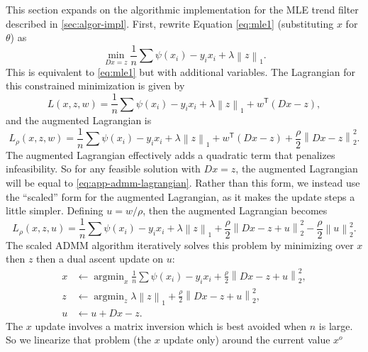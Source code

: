 \documentclass[ejs,noshowframe]{imsart}
\theoremstyle{plain}
\theoremstyle{definition}
\DeclareMathOperator*{\argmin}{argmin}
\renewcommand{\top}{\mathsf{T}}
\begin{document}
\begin{appendix}
This section expands on the algorithmic implementation for the MLE trend filter
described in \autoref{sec:algor-impl}. First, rewrite Equation \eqref{eq:mle1} 
(substituting $x$ for $\theta$) as
\begin{equation}
	\min_{Dx=z} \frac{1}{n}\sum \psi(x_i) - y_i x_i + \lambda \left\lVert z 
	\right\rVert_1.
\end{equation}
This is equivalent to \eqref{eq:mle1} but with additional variables.
The Lagrangian for this constrained minimization is given by
\begin{equation}
	\label{eq:app-admm-lagrangian}
	L(x,z,w) = \frac{1}{n}\sum \psi(x_i) - y_i x_i + \lambda \left\lVert z 
	\right\rVert_1
	+ w^{\top}(Dx-z),
\end{equation}
and the augmented Lagrangian is
\begin{equation}
	L_{\rho}(x,z,w) = \frac{1}{n}\sum \psi(x_i) - y_i x_i + \lambda \left\lVert z 
	\right\rVert_1
	+ w^{\top}(Dx-z) + \frac{\rho}{2}\left\lVert Dx-z\right\rVert_2^2.
\end{equation}
The augmented Lagrangian effectively adds a quadratic term that penalizes
infeasibility. So for any feasible solution with $Dx=z$, the augmented
Lagrangian will be equal to \eqref{eq:app-admm-lagrangian}.
Rather than this form, we instead use the ``scaled'' form for the augmented
Lagrangian, as it makes the update steps a little simpler. Defining $u=w/\rho$, 
then
the augmented Lagrangian becomes
\begin{equation}
	L_{\rho}(x,z,u) = \frac{1}{n}\sum \psi(x_i) - y_i x_i +
	\lambda \left\lVert z \right\rVert_1 + \frac{\rho}{2}\left\lVert Dx - z + 
	u\right\rVert_2^2
	- \frac{\rho}{2}\left\lVert u \right\rVert_2^2.
\end{equation}
\noindent
 The scaled ADMM algorithm iteratively solves this problem by minimizing over 
 $x$
then $z$ then a dual ascent update on $u$: 
\begin{align}
	x &\leftarrow \argmin_x \frac{1}{n}\sum \psi(x_i) - y_i x_i +
	\frac{\rho}{2}\left\lVert Dx-z+u\right\rVert_2^2,
	\label{eq:app-admm-x-update}\\ 
	z &\leftarrow \argmin_z \lambda \left\lVert z \right\rVert_1 +
	\frac{\rho}{2}\left\lVert Dx-z+u\right\rVert_2^2,\\ 
	u &\leftarrow u + Dx - z.
\end{align}
The $x$ update involves a matrix inversion which is best avoided when
$n$ is large. So we linearize that 
problem (the $x$ update 
only) around the current value $x^o$  
\begin{equation}

\end{equation}
\end{appendix}
\end{document}
